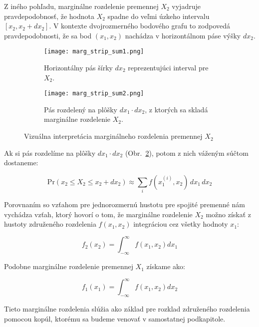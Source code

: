Z iného pohľadu, marginálne rozdelenie premennej $X_2$ vyjadruje pravdepodobnosť, že hodnota $X_2$ spadne do veľmi úzkeho intervalu $[x_2, x_2 + dx_2]$. V kontexte dvojrozmerného bodového grafu to zodpovedá pravdepodobnosti, že sa bod $(x_1, x_2)$ nachádza v horizontálnom páse výšky $dx_2$.

\begin{figure}[H]
    \centering
    \begin{subfigure}[b]{0.48\linewidth}
        \centering
        \texttt{[image: marg\_strip\_sum1.png]}
        \caption{Horizontálny pás šírky $dx_2$ reprezentujúci interval pre $X_2$.}
        \label{fig:marg_strip_a}
    \end{subfigure}
    \hfill
    \begin{subfigure}[b]{0.48\linewidth}
        \centering
        \texttt{[image: marg\_strip\_sum2.png]}
        \caption{Pás rozdelený na plôšky $dx_1 \cdot dx_2$, z ktorých sa skladá marginálne rozdelenie $X_2$.}
        \label{fig:marg_strip_b}
    \end{subfigure}
    \caption{Vizuálna interpretácia marginálneho rozdelenia premennej $X_2$}
    \label{fig:marg_strip}
\end{figure}

Ak si pás rozdelíme na plôšky $dx_1 \cdot dx_2$  (Obr.~\ref{fig:marg_strip_b}), potom z nich váženým súčtom dostaneme:

\begin{equation}
\mathrm{Pr}(x_2 \leq X_2 \leq x_2 + dx_2) \approx \sum_i f(x_1^{(i)}, x_2) \, dx_1 \, dx_2
\end{equation}

Porovnaním so vzťahom pre jednorozmernú hustotu pre spojité premenné nám vychádza vzťah, ktorý hovorí o tom, že marginálne rozdelenie $X_2$ možno získať z hustoty združeného rozdelenia $f(x_1, x_2)$ integráciou cez všetky hodnoty $x_1$:

\begin{equation} f_2(x_2) = \int_{-\infty}^{\infty} f(x_1, x_2) dx_1 \end{equation}

Podobne marginálne rozdelenie premennej $X_1$ získame ako:

\begin{equation} f_1(x_1) = \int_{-\infty}^{\infty} f(x_1, x_2)  dx_2 \end{equation}

Tieto marginálne rozdelenia slúžia ako základ pre rozklad združeného rozdelenia pomocou kopúl, ktorému sa budeme venovať v samostatnej podkapitole.

